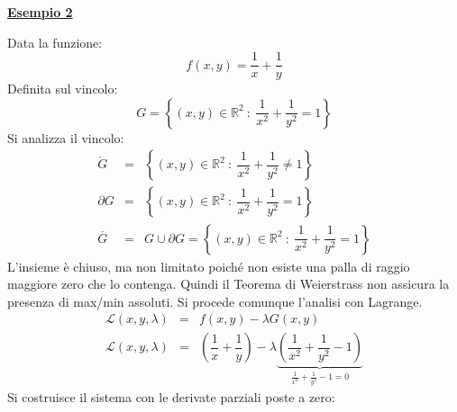 \documentclass[a4paper]{article}
\newcommand{\example}[1]{\textcolor{Green4}{\textbf{#1}}}
\begin{document}
	\begin{flushleft}
		\example{\underline{Esempio 2}}
	\end{flushleft}
	Data la funzione:
	\begin{equation*}
		f\left(x,y\right) = \dfrac{1}{x} + \dfrac{1}{y}
	\end{equation*}
	Definita sul vincolo:
	\begin{equation*}
		G = \left\{\left(x,y\right) \in \mathbb{R}^{2} \: : \: \dfrac{1}{x^{2}} + \dfrac{1}{y^{2}} = 1\right\}
	\end{equation*}
	Si analizza il vincolo:
	\begin{equation*}
		\begin{array}{rcl}
			\mathring{G} &=& \left\{\left(x,y\right) \in \mathbb{R}^{2} \: : \: \dfrac{1}{x^{2}} + \dfrac{1}{y^{2}} \ne 1\right\} \\ [1em]
			\partial G &=& \left\{\left(x,y\right) \in \mathbb{R}^{2} \: : \: \dfrac{1}{x^{2}} + \dfrac{1}{y^{2}} = 1\right\} \\ [1em]
			\overline{G} &=& G \cup \partial G = \left\{\left(x,y\right) \in \mathbb{R}^{2} \: : \: \dfrac{1}{x^{2}} + \dfrac{1}{y^{2}} = 1\right\}
		\end{array}
	\end{equation*}
	L'insieme è chiuso, ma non limitato poiché non esiste una palla di raggio maggiore zero che lo contenga. Quindi il Teorema di Weierstrass non assicura la presenza di max/min assoluti. Si procede comunque l'analisi con Lagrange.
	\begin{equation*}
		\begin{array}{rcl}
			\mathcal{L}\left(x,y,\lambda\right) &=& f\left(x,y\right) - \lambda G\left(x,y\right) \\ [.3em]
			\mathcal{L}\left(x,y,\lambda\right) &=& \left(\dfrac{1}{x} + \dfrac{1}{y}\right) - \lambda \underbrace{\left(\dfrac{1}{x^{2}} + \dfrac{1}{y^{2}} - 1\right)}_{\frac{1}{x^{2}} + \frac{1}{y^{2}} - 1 = 0}
		\end{array}
	\end{equation*}
	Si costruisce il sistema con le derivate parziali poste a zero:
\end{document}
